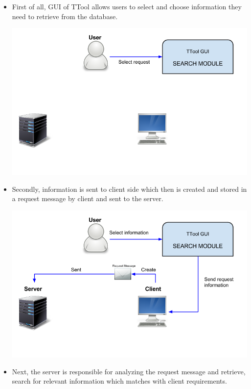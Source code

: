 \documentclass[a4paper,12pt,oneside]{report}
\begin{document}
	\begin {itemize}
	\item First of all, GUI of TTool allows users to select and choose information they need to retrieve from the database. 
	\begin{center}
	\includegraphics[scale=0.5]{Protocol1.png}\par
	\end{center}
	
	\item Secondly, information is sent to client side which then is created and stored in a request message by client and sent to the server. 
	\begin{center}
	\includegraphics[scale=0.5]{Protocol2.png}\par
	\end{center}
		
	\item Next, the server is responsible for analyzing the request message and retrieve, search for relevant information which matches with client requirements. 


\end{itemize}
\end{document}
